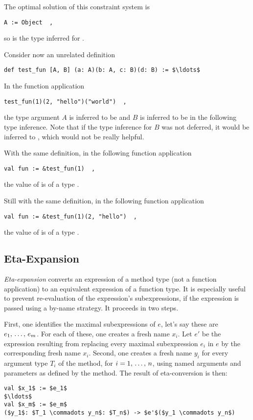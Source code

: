 The optimal solution of this constraint system is
\begin{lstlisting}
A := Object  ,
\end{lstlisting}
so  is the type inferred for . 

\example Consider now an unrelated definition
\begin{lstlisting}
def test_fun [A, B] (a: A)(b: A, c: B)(d: B) := $\ldots$
\end{lstlisting}

In the function application
\begin{lstlisting}
test_fun(1)(2, "hello")("world")  ,
\end{lstlisting}
the type argument $A$ is inferred to be  and $B$ is inferred to be  in the following type inference. Note that if the type inference for $B$ was not deferred, it would be inferred to , which would not be really helpful. 

With the same definition, in the following function application
\begin{lstlisting}
val fun := &test_fun(1)  ,
\end{lstlisting}
the value of  is of a type .

Still with the same definition, in the following function application
\begin{lstlisting}
val fun := &test_fun(1)(2, "hello")  ,
\end{lstlisting}
the value of  is of a type .





\subsection{Eta-Expansion}
\label{sec:eta-expansion}

{\em Eta-expansion} converts an expression of a method type (not a function application) to an equivalent expression of a function type. It is especially useful to prevent re-evaluation of the expression's subexpressions, if the expression is passed using a by-name strategy. It proceeds in two steps. 

First, one identifies the maximal subexpressions of $e$, let's say these are $e_1 ,\, \ldots ,\, e_m$. For each of these, one creates a fresh name $x_i$. Let $e'$ be the expression resulting from replacing every maximal subexpression $e_i$ in $e$ by the corresponding fresh name $x_i$. Second, one creates a fresh name $y_i$ for every argument type $T_i$ of the method, for $i = 1 ,\, \ldots ,\, n$, using named arguments and parameters as defined by the method. The result of eta-conversion is then: 
\begin{lstlisting}
val $x_1$ := $e_1$
$\ldots$
val $x_m$ := $e_m$
($y_1$: $T_1 \commadots y_n$: $T_n$) -> $e'$($y_1 \commadots y_n$)
\end{lstlisting}








